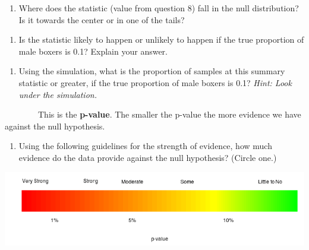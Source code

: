 \documentclass[
]{report}
\providecommand{\tightlist}{%
  \setlength{\itemsep}{0pt}\setlength{\parskip}{0pt}}
\begin{document}
\vspace{1in}

\begin{enumerate}
\def\labelenumi{\arabic{enumi}.}
\setcounter{enumi}{19}
\tightlist
\item
  Where does the statistic (value from question 8) fall in the null distribution? Is it towards the center or in one of the tails?
\end{enumerate}

\vspace{1in}

\begin{enumerate}
\def\labelenumi{\arabic{enumi}.}
\setcounter{enumi}{20}
\tightlist
\item
  Is the statistic likely to happen or unlikely to happen if the true proportion of male boxers is 0.1? Explain your answer.
\end{enumerate}

\vspace{1in}

\begin{enumerate}
\def\labelenumi{\arabic{enumi}.}
\setcounter{enumi}{21}
\tightlist
\item
  Using the simulation, what is the proportion of samples at this summary statistic or greater, if the true proportion of male boxers is 0.1? \emph{Hint: Look under the simulation.}
\end{enumerate}

\vspace{1in}

~~~~~~~~This is the \textbf{p-value}. The smaller the p-value the more evidence we have against the null hypothesis.

\begin{enumerate}
\def\labelenumi{\arabic{enumi}.}
\setcounter{enumi}{22}
\tightlist
\item
  Using the following guidelines for the strength of evidence, how much evidence do the data provide against the null hypothesis? (Circle one.)
\end{enumerate}

\includegraphics{images/soe_gradient.png}
\end{document}
